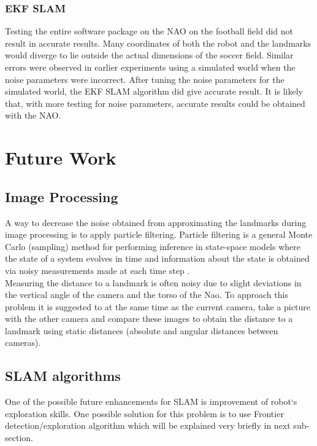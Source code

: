 \documentclass{ba-kecs}
\numberwithin{figure}{section}
\numberwithin{equation}{section}
\begin{document}
{\subsubsection{EKF SLAM}
Testing the entire software package on the NAO on the football field did not result in accurate results. Many coordinates of both the robot and the landmarks would diverge to lie outside the actual dimensions of the soccer field. Similar errors were observed in earlier experiments using a simulated world when the noise parameters were incorrect. After tuning the noise parameters for the simulated world, the EKF SLAM algorithm did give accurate result. It is likely that, with more testing for noise parameters, accurate results could be obtained with the NAO.



\section{Future Work}

\subsection{Image Processing}
	A way to decrease the noise obtained from approximating the landmarks during image processing is to apply particle filtering. Particle filtering is a general Monte Carlo (sampling) method for performing inference in
state-space models where the state of a system evolves in time and information about the state is obtained via noisy measurements made at each time step \cite{ParFil}. \\

	Measuring the distance to a landmark is often noisy due to slight deviations in the vertical angle of the camera and the torso of the Nao. To approach this problem it is suggested to at the same time as the current camera, take a picture with the other camera and compare these images to obtain the distance to a landmark using static distances (absolute and angular distances between cameras).
\subsection{SLAM algorithms}	
	One of the possible future enhancements for SLAM is improvement of robot`s exploration skills. One possible solution for this problem is to use Frontier detection/exploration algorithm which will be explained very briefly in next sub-section.
	
}
\end{document}
